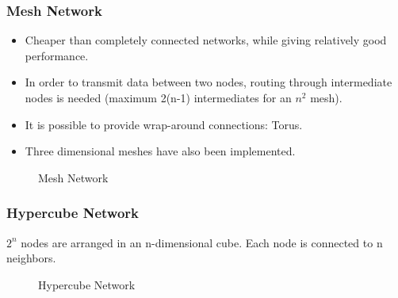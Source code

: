 \subsubsection{Mesh Network}
\begin{itemize}
\item Cheaper than completely connected networks, while giving relatively good performance.
\item In order to transmit data between two nodes, routing through intermediate nodes is needed (maximum 2(n-1) intermediates for an $n^2$ mesh).
\item It is possible to provide wrap-around connections: Torus.
\item Three dimensional meshes have also been implemented.
\end{itemize}

\begin{figure}
  \hfill
  \hfill
  \hfill
  \caption{Mesh Network}
\end{figure}

\subsubsection{Hypercube Network}
$2^n$ nodes are arranged in an n-dimensional cube. Each node is connected to n neighbors.
\begin{figure}[H]
  \centering
  \caption{Hypercube Network}
  \label{fig:hypercube-network}
\end{figure}
